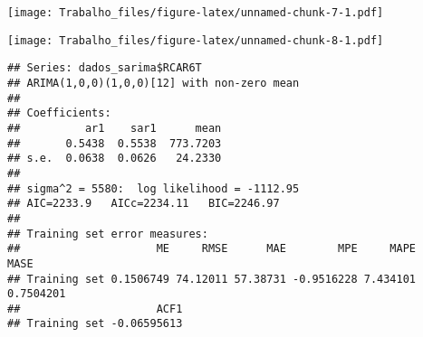 \documentclass[
]{article}
\newenvironment{Shaded}{\begin{snugshade}}{\end{snugshade}}
\newcommand{\AttributeTok}[1]{\textcolor[rgb]{0.13,0.29,0.53}{#1}}
\newcommand{\DecValTok}[1]{\textcolor[rgb]{0.00,0.00,0.81}{#1}}
\newcommand{\FunctionTok}[1]{\textcolor[rgb]{0.13,0.29,0.53}{\textbf{#1}}}
\newcommand{\NormalTok}[1]{#1}
\newcommand{\OtherTok}[1]{\textcolor[rgb]{0.56,0.35,0.01}{#1}}
\newcommand{\SpecialCharTok}[1]{\textcolor[rgb]{0.81,0.36,0.00}{\textbf{#1}}}
\begin{document}
\begin{Shaded}
\end{Shaded}

\texttt{[image: Trabalho\_files/figure-latex/unnamed-chunk-7-1.pdf]}

\begin{Shaded}
\end{Shaded}

\texttt{[image: Trabalho\_files/figure-latex/unnamed-chunk-8-1.pdf]}

\begin{Shaded}
\end{Shaded}

\begin{verbatim}
## Series: dados_sarima$RCAR6T 
## ARIMA(1,0,0)(1,0,0)[12] with non-zero mean 
## 
## Coefficients:
##          ar1    sar1      mean
##       0.5438  0.5538  773.7203
## s.e.  0.0638  0.0626   24.2330
## 
## sigma^2 = 5580:  log likelihood = -1112.95
## AIC=2233.9   AICc=2234.11   BIC=2246.97
## 
## Training set error measures:
##                     ME     RMSE      MAE        MPE     MAPE      MASE
## Training set 0.1506749 74.12011 57.38731 -0.9516228 7.434101 0.7504201
##                     ACF1
## Training set -0.06595613
\end{verbatim}
\end{document}

